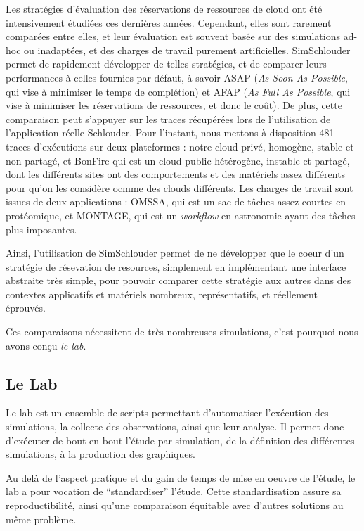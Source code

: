 \documentclass[parallelisme]{compas2017}
\begin{document}
Les stratégies d'évaluation des réservations de ressources de cloud ont été intensivement étudiées 
ces dernières années. Cependant, elles sont rarement comparées entre elles, et leur évaluation 
est souvent basée sur des simulations ad-hoc ou inadaptées, et des charges de travail purement artificielles.
SimSchlouder permet de rapidement développer de telles stratégies, et de comparer leurs performances 
à celles fournies par défaut, à savoir ASAP (\textit{As Soon As Possible}, qui vise à minimiser le temps de 
complétion) et AFAP (\textit{As Full As Possible}, qui vise à minimiser les réservations de ressources,
et donc le coût). De plus, cette comparaison peut s'appuyer sur les traces récupérées lors de l'utilisation 
de l'application réelle Schlouder. Pour l'instant, nous mettons à disposition 481 traces d'exécutions
sur deux plateformes : notre cloud privé, homogène, stable et non partagé, et BonFire qui est un cloud 
public hétérogène, instable et partagé, dont les différents sites ont des comportements et des matériels 
assez différents pour qu'on les considère ocmme des clouds différents.
Les charges de travail sont issues de deux applications : OMSSA, qui est un sac de tâches assez courtes 
en protéomique, et MONTAGE, qui est un \textit{workflow} en astronomie ayant des tâches plus imposantes. 

Ainsi, l'utilisation de SimSchlouder permet de ne développer que le coeur d'un stratégie de résevation 
de resources, simplement en implémentant une interface abstraite très simple, pour pouvoir comparer cette 
stratégie aux autres dans des contextes applicatifs et matériels nombreux, représentatifs, et réellement 
éprouvés.

Ces comparaisons nécessitent de très nombreuses simulations, c'est pourquoi nous avons conçu \emph{le lab}.

\subsection{Le Lab}

Le lab est un ensemble de scripts permettant d'automatiser l'exécution des simulations, la collecte des
observations, ainsi que leur analyse. Il permet donc d'exécuter de bout-en-bout l'étude par simulation,
de la définition des différentes simulations, à la production des graphiques.

Au delà de l'aspect pratique et du gain de temps de mise en oeuvre de l'étude, le lab a pour vocation
de ``standardiser'' l'étude. Cette standardisation assure sa reproductibilité, ainsi qu'une comparaison
équitable avec d'autres solutions au même problème.
\end{document}
